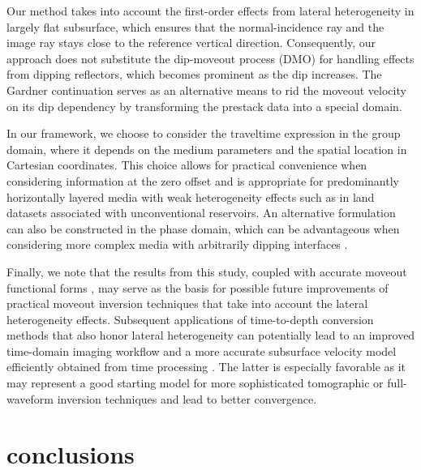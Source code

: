 Our method takes into account the first-order effects from lateral heterogeneity in largely flat subsurface, which ensures that the normal-incidence ray and the image ray stays close to the reference vertical direction. Consequently, our approach does not substitute the dip-moveout process (DMO) for handling effects from dipping reflectors, which becomes prominent as the dip increases. The Gardner continuation \cite[]{gardner} serves as an alternative means to rid the moveout velocity on its dip dependency by transforming the prestack data into a special domain.

In our framework, we choose to consider the traveltime expression in the group domain, where it depends on the medium parameters and the spatial location in Cartesian coordinates. This choice allows for practical convenience when considering information at the zero offset and is appropriate for predominantly horizontally layered media with weak heterogeneity effects such as in land datasets associated with unconventional reservoirs. An alternative formulation can also be constructed in the phase domain, which can be advantageous when considering more complex media with arbitrarily dipping interfaces \cite[]{nmosurface,stackingtomo}.

Finally, we note that the results from this study, coupled with accurate moveout functional forms \cite[]{fomelstovas,zonegmapaper}, may serve as the basis for possible future improvements of practical moveout inversion techniques that take into account the lateral heterogeneity effects. Subsequent applications of time-to-depth conversion methods that also honor lateral heterogeneity can potentially lead to an improved time-domain imaging workflow and a more accurate subsurface velocity model efficiently obtained from time processing \cite[]{cam,siweit2d,valente,zonet2dweak}. The latter is especially favorable as it may represent a good starting model for more sophisticated tomographic or full-waveform inversion techniques and lead to better convergence.

\section{conclusions}

